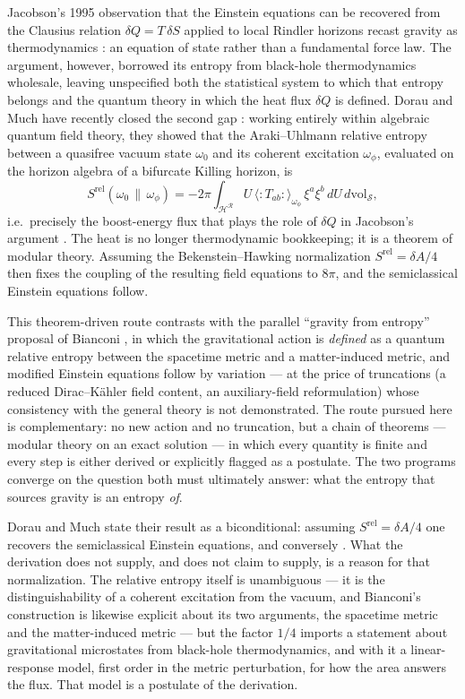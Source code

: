 \documentclass[11pt]{article}
\newcommand{\Srel}{S^{\mathrm{rel}}}
\begin{document}
Jacobson's 1995 observation that the Einstein equations can be recovered from the Clausius relation $\delta Q = T\,\delta S$ applied to local Rindler horizons recast gravity as thermodynamics \cite{Jacobson}: an equation of state rather than a fundamental force law. The argument, however, borrowed its entropy from black-hole thermodynamics wholesale, leaving unspecified both the statistical system to which that entropy belongs and the quantum theory in which the heat flux $\delta Q$ is defined. Dorau and Much have recently closed the second gap \cite{DorauMuch}: working entirely within algebraic quantum field theory, they showed that the Araki--Uhlmann relative entropy between a quasifree vacuum state $\omega_0$ and its coherent excitation $\omega_\phi$, evaluated on the horizon algebra of a bifurcate Killing horizon, is
\begin{equation}
\Srel(\omega_0 \,\|\, \omega_\phi)
= -2\pi \int_{\mathcal{H}^{\mathcal{R}}} U \,\langle{:}T_{ab}{:}\rangle_{\omega_\phi}\, \xi^a \xi^b \, dU\, d\mathrm{vol}_{\mathcal{S}},
\label{eq:DM-pivot}
\end{equation}
i.e.\ precisely the boost-energy flux that plays the role of $\delta Q$ in Jacobson's argument \cite{Jacobson}. The heat is no longer thermodynamic bookkeeping; it is a theorem of modular theory. Assuming the Bekenstein--Hawking normalization $\Srel = \delta A/4$ then fixes the coupling of the resulting field equations to $8\pi$, and the semiclassical Einstein equations follow.

This theorem-driven route contrasts with the parallel ``gravity from entropy'' proposal of Bianconi \cite{Bianconi2025,Bianconi2026}, in which the gravitational action is \emph{defined} as a quantum relative entropy between the spacetime metric and a matter-induced metric, and modified Einstein equations follow by variation --- at the price of truncations (a reduced Dirac--K\"ahler field content, an auxiliary-field reformulation) whose consistency with the general theory is not demonstrated. The route pursued here is complementary: no new action and no truncation, but a chain of theorems --- modular theory on an exact solution --- in which every quantity is finite and every step is either derived or explicitly flagged as a postulate. The two programs converge on the question both must ultimately answer: what the entropy that sources gravity is an entropy \emph{of}.

Dorau and Much state their result as a biconditional: assuming $\Srel = \delta A/4$ one recovers the semiclassical Einstein equations, and conversely \cite{DorauMuch}. What the derivation does not supply, and does not claim to supply, is a reason for that normalization. The relative entropy itself is unambiguous --- it is the distinguishability of a coherent excitation from the vacuum, and Bianconi's construction is likewise explicit about its two arguments, the spacetime metric and the matter-induced metric \cite{Bianconi2025} --- but the factor $1/4$ imports a statement about gravitational microstates from black-hole thermodynamics, and with it a linear-response model, first order in the metric perturbation, for how the area answers the flux. That model is a postulate of the derivation.
\end{document}
